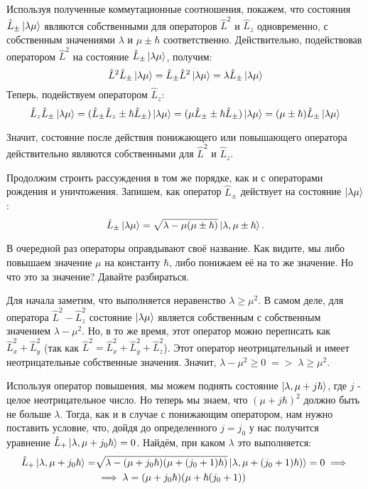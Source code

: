 Используя полученные коммутационные соотношения, покажем, что состояния $\hat{L}_{\pm}\ket{\lambda\mu}$ являются собственными для операторов $\hat{L}^2$ и $\hat{L}_z$ одновременно, с собственным значениями $\lambda$ и $\mu \pm \hbar$ соответственно. Действительно, подействовав оператором $\hat{L}^2$ на состояние $\hat{L}_{\pm}\ket{\lambda\mu}$, получим:
\[
\hat{L}^2\hat{L}_{\pm}\ket{\lambda\mu} = \hat{L}_{\pm}\hat{L}^2\ket{\lambda\mu} = \lambda\hat{L}_{\pm}\ket{\lambda\mu}
\]
Теперь, подействуем оператором $\hat{L}_z$:
\[
\hat{L}_z\hat{L}_{\pm}\ket{\lambda\mu} = (\hat{L}_{\pm}\hat{L}_z \pm \hbar\hat{L}_{\pm})\ket{\lambda\mu} = (\mu\hat{L}_{\pm} \pm \hbar\hat{L}_{\pm})\ket{\lambda\mu} = (\mu \pm \hbar)\hat{L}_{\pm}\ket{\lambda\mu}
\]

Значит, состояние после действия понижающего или повышающего оператора действительно являются собственными для $\hat{L}^2$ и $\hat{L}_z$.

Продолжим строить рассуждения в том же порядке, как и с операторами рождения и уничтожения. Запишем, как оператор $\hat{L}_{\pm}$ действует  на состояние $\ket{\lambda\mu}$:
\[
\hat{L}_{\pm}\ket{\lambda\mu} = \sqrt{\lambda - \mu(\mu \pm \hbar)}\ket{\lambda,\mu\pm\hbar}.
\]

В очередной раз операторы оправдывают своё название. Как видите, мы либо повышаем значение $\mu$ на константу $\hbar$, либо понижаем её на то же значение. Но что это за значение? Давайте разбираться.

Для начала заметим, что выполняется неравенство $\lambda \geq \mu^2$. В самом деле, для оператора $\hat{L}^2 - \hat{L}^2_z$ состояние $\ket{\lambda\mu}$ является собственным с собственным значением $\lambda - \mu^2$. Но, в то же время, этот оператор можно переписать как $\hat{L}^2_x + \hat{L}^2_y$ (так как $\hat{L}^2 = \hat{L}^2_x + \hat{L}^2_y + \hat{L}^2_z$). Этот оператор неотрицательный и имеет неотрицательные собственные значения. Значит, $\lambda - \mu^2 \geq 0\; => \; \lambda \geq \mu^2$.

Используя оператор повышения, мы можем поднять состояние $\ket{\lambda,\mu + j\hbar}$, где $j$ - целое неотрицательное число. Но теперь мы знаем, что $(\mu + j\hbar)^2$ должно быть не больше $\lambda$. Тогда, как и в случае с понижающим оператором, нам нужно поставить условие, что, дойдя до определенного $j = j_0$ у нас получится уравнение $\hat{L}_+\ket{\lambda, \mu + j_0\hbar} = 0$. Найдём, при каком $\lambda$ это выполняется:
\begin{align*}
\hat{L}_{+}\ket{\lambda,\mu + j_0\hbar} = &\sqrt{\lambda - (\mu+j_0\hbar)(\mu + (j_0 + 1)\hbar)}\ket{\lambda,\mu +(j_0 + 1)\hbar)} = 0 \implies \\ 
& \implies  \lambda = (\mu + j_0\hbar)(\mu + \hbar(j_0 + 1))
\end{align*}


